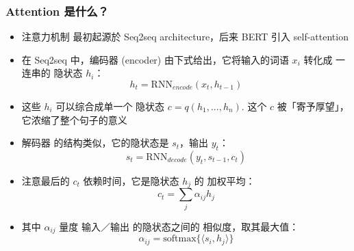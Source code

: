 \documentclass[16pt]{beamer}
\newcommand{\emp}[1]{{\color{violet}#1}}
\begin{document}
\begin{frame}
\frametitle{Attention 是什么？}
\begin{itemize}
	\item 注意力机制 最初起源於 Seq2seq architecture，后来 BERT 引入 self-attention

	\item 在 Seq2seq 中，编码器 (encoder) 由下式给出，它将输入的词语 $x_i$ 转化成 一连串的 隐状态 $h_i$：
	\begin{equation}
	h_t = \mbox{RNN}_{encode}(x_t, h_{t-1})
	\end{equation}

	\item 这些 $h_i$ 可以综合成单一个 隐状态 $c = q(h_1, ..., h_n)$.  这个 $c$ 被「寄予厚望」，它浓缩了整个句子的意义
	
	\item 解码器 的结构类似，它的隐状态是 $s_t$，输出 $y_t$：
	\begin{equation}
	s_t = \mbox{RNN}_{decode}(y_t, s_{t-1}, c_t)
	\end{equation}
	
	\item 注意最后的 $c_t$ 依赖时间，它是隐状态 $h_j$ 的 \emp{加权平均}：
	\begin{equation}
	c_t = \sum_j \alpha_{ij} h_j
	\end{equation}
	
	\item 其中 $\alpha_{ij}$ 量度 输入／输出 的隐状态之间的 \emp{相似度}，取其最大值：
	\begin{equation}
	\alpha_{ij} = \mbox{softmax} \{ \langle s_i, h_j \rangle \}
	\end{equation}
\end{itemize}
\end{frame}
\end{document}
